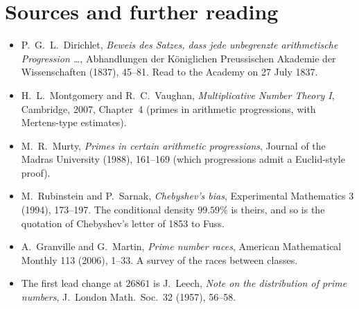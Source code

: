 \section*{Sources and further reading}

\begin{itemize}
\item P.~G.~L.~Dirichlet, \emph{Beweis des Satzes, dass jede unbegrenzte arithmetische Progression \dots}, Abhandlungen der Königlichen
Preussischen Akademie der Wissenschaften (1837), 45--81. Read to the Academy on 27 July 1837.
\item H.~L.~Montgomery and R.~C.~Vaughan, \emph{Multiplicative Number Theory I}, Cambridge, 2007, Chapter~4 (primes in arithmetic
progressions, with Mertens-type estimates).
\item M.~R.~Murty, \emph{Primes in certain arithmetic progressions}, Journal of the Madras University (1988), 161--169 (which progressions admit
a Euclid-style proof).
\item M.~Rubinstein and P.~Sarnak, \emph{Chebyshev's bias}, Experimental Mathematics 3 (1994), 173--197. The conditional density $99.59\%$ is theirs, and so is the quotation of Chebyshev's letter of 1853 to Fuss.
\item A.~Granville and G.~Martin, \emph{Prime number races}, American Mathematical Monthly 113 (2006), 1--33. A survey of the races
between classes.
\item The first lead change at $26861$ is J.~Leech, \emph{Note on the distribution of prime numbers}, J.\ London Math.\ Soc.\ 32 (1957), 56--58.
\end{itemize}
